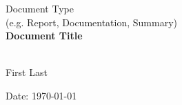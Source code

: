 \documentclass[12pt, a4paper]{article}
\begin{document}
\begin{titlepage}
  {\centering

  \vskip 4.5cm
  {\Large Document Type}\\
  (e.g. Report, Documentation, Summary)\\
  \vskip 1.5cm
  {\LARGE{\textbf{Document Title}}}\\
  \vskip 0.2cm
  {\LARGE{}}\\
  \vskip 2cm

  First Last\\
  \vskip 0.2cm

  \vskip 2.0cm
  {\small Date: \today}\\
  \vskip 4.0cm

  \vfill
  }
\end{titlepage}




\setcounter{page}{2}
\pagestyle{plain}





% 
% 
\end{document}

